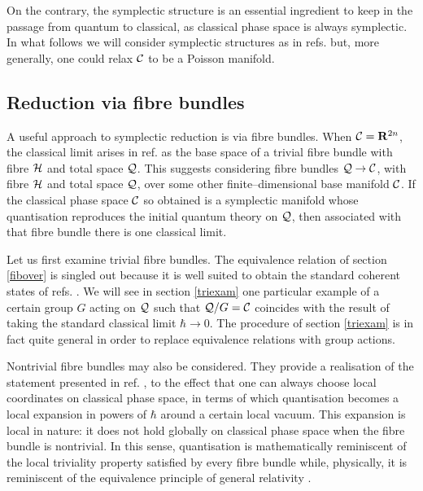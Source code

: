 \documentclass[a4paper,a4paper]{article}
\begin{document}
On the contrary, the symplectic structure is an essential ingredient to keep in the passage 
from quantum to classical, as classical phase space is always symplectic. 
In what follows we will consider symplectic structures as in refs. \cite{GS, MUELLER} but, 
more generally, one could relax ${\cal C}$ to be a Poisson manifold. 

\subsection{Reduction via fibre bundles}\label{diffib}

A useful approach to symplectic reduction is via fibre bundles. 
When ${\cal C}={\bf R}^{2n}$, the classical limit arises in ref. \cite{ASHTEKAR} 
as the base space of a trivial fibre bundle with fibre ${\cal H}$ and total space ${\cal Q}$. 
This suggests considering fibre bundles ${\cal Q}\rightarrow {\cal C}$, with fibre ${\cal H}$ 
and total space ${\cal Q}$, over some other finite--dimensional base manifold ${\cal C}$.
If the classical phase space ${\cal C}$ so obtained is a symplectic manifold 
whose  quantisation reproduces the initial quantum theory on ${\cal Q}$, 
then associated with that fibre bundle there is one classical limit.

Let us first examine trivial fibre bundles. The equivalence relation of section \ref{fibover} 
is singled out because it is well suited to obtain the standard coherent states of refs. 
\cite{COHST, PERELOMOV}. We will see in section \ref{triexam} one particular example 
of a certain group $G$ acting on ${\cal Q}$ such that ${\cal Q}/G={\cal C}$ coincides 
with the result of taking the standard classical limit $\hbar\to 0$. The procedure 
of section \ref{triexam} is in fact quite general in order to replace equivalence relations 
with group actions.

Nontrivial fibre bundles may also be considered. They provide a realisation of the statement 
presented in ref. \cite{NOS}, to the effect that one can always choose local 
coordinates on classical phase space, in terms of which quantisation 
becomes a local expansion in powers of ${\hbar}$ around a certain local 
vacuum.
This expansion is local in nature: it does not hold globally on classical phase space
when the fibre bundle is nontrivial. In this sense, quantisation is 
mathematically reminiscent of the local triviality property satisfied by every 
fibre bundle \cite{STEENROD} while, physically, it is reminiscent of the 
equivalence principle of general relativity \cite{WEINBERG}.
\end{document}

